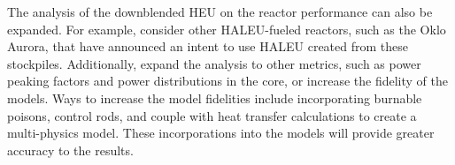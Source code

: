 The analysis of the downblended \gls{HEU} on the reactor performance
can also be expanded. For example, consider other \gls{HALEU}-fueled 
reactors, such as the Oklo Aurora, that have announced an intent to 
use \gls{HALEU} created from these stockpiles. Additionally, expand 
the analysis to other metrics, such as power peaking factors and 
power distributions in the core, or 
increase the fidelity of the models. Ways to increase the model 
fidelities include incorporating burnable poisons, control rods, 
and couple with heat transfer calculations to create a multi-physics model. 
These incorporations into the models will provide greater 
accuracy to the results. 